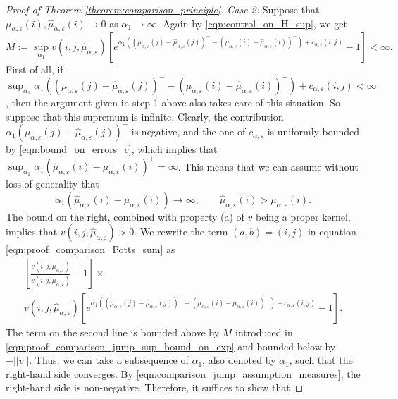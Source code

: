 \documentclass[a4paper]{article}
\newcommand{\vn}[1]{\left| \! \left| #1\right| \! \right|}
\numberwithin{equation}{section}
\theoremstyle{definition}
\begin{document}
\begin{proof}[Proof of Theorem \ref{theorem:comparison_principle}]
	\textit{Case 2:} Suppose that $\mu_{\alpha,\varepsilon}(i),\hat{\mu}_{\alpha,\varepsilon}(i) \rightarrow 0$ as $\alpha_1 \rightarrow \infty$. Again by \eqref{eqn:control_on_H_sup}, we get
	\begin{equation} \label{eqn:proof_comparison_jump_sup_bound_on_exp}
		M:= \sup_{\alpha_1} v(i,j,\hat{\mu}_{\alpha,\varepsilon}) \left[e^{\alpha_1\left(\left(\mu_{\alpha,\varepsilon}(j) - \hat{\mu}_{\alpha,\varepsilon}(j)\right)^- - \left(\mu_{\alpha,\varepsilon}(i) - \hat{\mu}_{\alpha,\varepsilon}(i)\right)^-\right) + c_{\alpha,\varepsilon}(i,j)} - 1\right] < \infty.
	\end{equation}
	First of all, if $\sup_{\alpha_1} \alpha_1\left(\left(\mu_{\alpha,\varepsilon}(j) - \hat{\mu}_{\alpha,\varepsilon}(j)\right)^- - \left(\mu_{\alpha,\varepsilon}(i) - \hat{\mu}_{\alpha,\varepsilon}(i)\right)^-\right) + c_{\alpha,\varepsilon}(i,j) < \infty$, then the argument given in step 1 above also takes care of this situation. So suppose that this supremum is infinite. Clearly, the contribution $\alpha_1\left(\mu_{\alpha,\varepsilon}(j) - \hat{\mu}_{\alpha,\varepsilon}(j)\right)^-$ is negative, and the one of $c_{\alpha,\varepsilon}$ is uniformly bounded by \eqref{eqn:bound_on_errors_c}, which implies that $\sup_{\alpha_1} \alpha_1\left(\hat{\mu}_{\alpha,\varepsilon}(i) -\mu_{\alpha,\varepsilon}(i)\right)^+ = \infty$. This means that we can assume without loss of generality that
	\begin{equation} \label{eqn:comparison_jump_assumption_measures}
		\alpha_1\left(\hat{\mu}_{\alpha,\varepsilon}(i) - \mu_{\alpha,\varepsilon}(i)\right) \rightarrow \infty, \qquad \hat{\mu}_{\alpha,\varepsilon}(i) > \mu_{\alpha,\varepsilon}(i). 
	\end{equation}
	The bound on the right, combined with property (a) of $v$ being a proper kernel, implies that $v(i,j,\hat{\mu}_{\alpha,\varepsilon}) > 0$. We rewrite the term $(a,b) = (i,j)$ in equation \eqref{eqn:proof_comparison_Potts_sum} as
	\begin{multline*}
		\left[\frac{v(i,j,\mu_{\alpha,\varepsilon})}{v(i,j,\hat{\mu}_{\alpha,\varepsilon})} - 1 \right] \times \\
		v(i,j,\hat{\mu}_{\alpha,\varepsilon}) \left[e^{\alpha_1\left(\left(\mu_{\alpha,\varepsilon}(j) - \hat{\mu}_{\alpha,\varepsilon}(j)\right)^- - \left(\mu_{\alpha,\varepsilon}(i) - \hat{\mu}_{\alpha,\varepsilon}(i)\right)^-\right) + c_{\alpha,\varepsilon}(i,j)} - 1\right].
	\end{multline*}
	The term on the second line is bounded above by $M$ introduced in \eqref{eqn:proof_comparison_jump_sup_bound_on_exp} and bounded below by $-\vn{v}$. Thus, we can take a subsequence of $\alpha_1$, also denoted by $\alpha_1$, such that the right-hand side converges. By \eqref{eqn:comparison_jump_assumption_measures}, the right-hand side is non-negative. Therefore, it suffices to show that

\end{proof}
\end{document}
